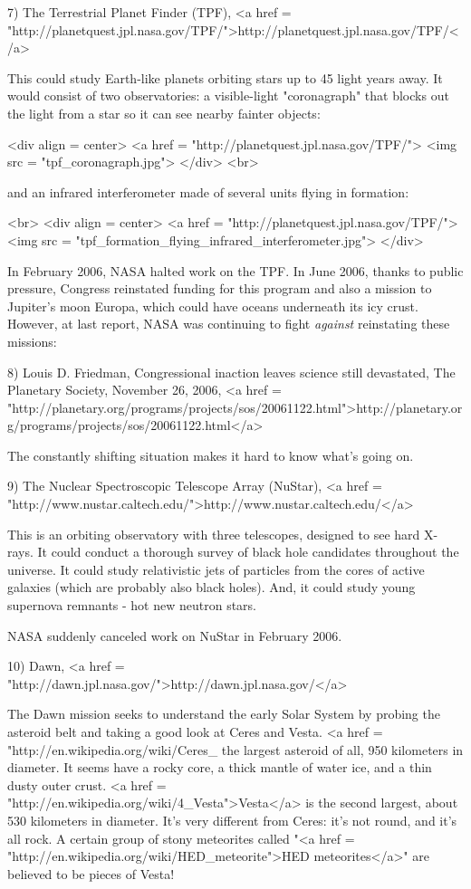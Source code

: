 7) The Terrestrial Planet Finder (TPF),
<a href = "http://planetquest.jpl.nasa.gov/TPF/">http://planetquest.jpl.nasa.gov/TPF/</a>

This could study Earth-like planets orbiting stars up to 45 light
years away.  It would consist of two observatories: a visible-light
"coronagraph" that blocks out the light from a star so it
can see nearby fainter objects:

<div align = center>
<a href = "http://planetquest.jpl.nasa.gov/TPF/">
<img src = "tpf_coronagraph.jpg">
</div>
<br>

and an infrared interferometer made of
several units flying in formation:

<br>
<div align = center>
<a href = "http://planetquest.jpl.nasa.gov/TPF/">
<img src = "tpf_formation_flying_infrared_interferometer.jpg">
</div>

In February 2006, NASA halted work on the TPF.  In June 2006, thanks
to public pressure, Congress reinstated funding for this
program and also a mission to Jupiter's moon Europa, which could have
oceans underneath its icy crust.  However, at last report, NASA was
continuing to fight \emph{against} reinstating these missions:

8) Louis D. Friedman, Congressional inaction leaves science still
devastated, The Planetary Society, November 26, 2006, 
<a href = "http://planetary.org/programs/projects/sos/20061122.html">http://planetary.org/programs/projects/sos/20061122.html</a>

The constantly shifting situation makes it hard to know what's
going on.

9) The Nuclear Spectroscopic Telescope Array (NuStar),
<a href = "http://www.nustar.caltech.edu/">http://www.nustar.caltech.edu/</a>

This is an orbiting observatory with three telescopes, designed to see 
hard X-rays.   It could conduct a thorough survey of black hole candidates
throughout the universe.  It could study relativistic jets of particles 
from the cores of active galaxies (which are probably also black holes).
And, it could study young supernova remnants - hot new neutron stars.

NASA suddenly canceled work on NuStar in February 2006.

10) Dawn, <a href = "http://dawn.jpl.nasa.gov/">http://dawn.jpl.nasa.gov/</a>

The Dawn mission seeks to understand the early Solar System by probing
the asteroid belt and taking a good look at Ceres and Vesta.  <a href
= "http://en.wikipedia.org/wiki/Ceres_%
the largest asteroid of all, 950 kilometers in diameter.  It
seems have a rocky core, a thick mantle of water ice, and a thin dusty
outer crust.  <a href = "http://en.wikipedia.org/wiki/4_Vesta">Vesta</a> is the second
largest, about 530 kilometers in diameter.  It's very different from
Ceres: it's not round, and it's all rock.  A certain group of stony
meteorites called "<a href =
"http://en.wikipedia.org/wiki/HED_meteorite">HED meteorites</a>"
are believed to be pieces of Vesta!

